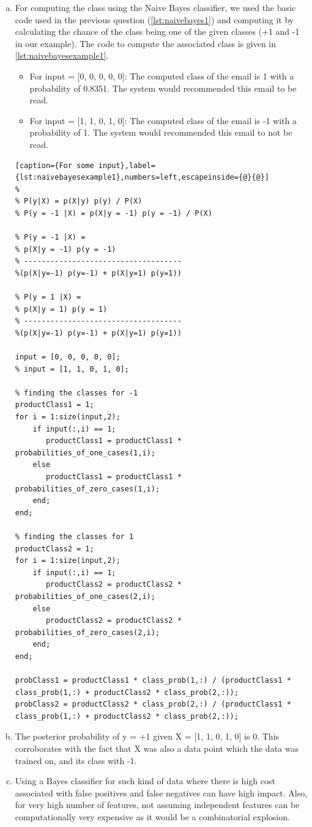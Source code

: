 \documentclass[a4paper, 11pt]{article}
\begin{document}
\begin{enumerate}[(a)]
\item For computing the class using the Naive Bayes classifier, we used the basic code used in the previous question (\autoref{lst:naivebayes1}) and computing it by calculating the chance of the class being one of the given classes (+1 and -1 in our example). The code to compute the associated class is given in \autoref{lst:naivebayesexample1}. 
\begin{itemize}
\item For input = [0, 0, 0, 0, 0]: The computed class of the email is 1 with a probability of 0.8351. The system would recommended this email to be read.
\item For input = [1, 1, 0, 1, 0]: The computed class of the email is -1 with a probability of 1. The system would recommended this email to not be read.
\end{itemize}
\vspace{-20pt}
\begin{lstlisting}[caption={For some input},label={lst:naivebayesexample1},numbers=left,escapeinside={@}{@}]
% 
% P(y|X) = p(X|y) p(y) / P(X)
% P(y = -1 |X) = p(X|y = -1) p(y = -1) / P(X)

% P(y = -1 |X) = 
% p(X|y = -1) p(y = -1)
% ------------------------------------
%(p(X|y=-1) p(y=-1) + p(X|y=1) p(y=1))

% P(y = 1 |X) = 
% p(X|y = 1) p(y = 1)
% ------------------------------------
%(p(X|y=-1) p(y=-1) + p(X|y=1) p(y=1))

input = [0, 0, 0, 0, 0];
% input = [1, 1, 0, 1, 0];

% finding the classes for -1
productClass1 = 1;
for i = 1:size(input,2); 
    if input(:,i) == 1;
       productClass1 = productClass1 *  probabilities_of_one_cases(1,i);
    else
       productClass1 = productClass1 *  probabilities_of_zero_cases(1,i);
    end;
end;

% finding the classes for 1
productClass2 = 1;
for i = 1:size(input,2);
    if input(:,i) == 1;
       productClass2 = productClass2 *  probabilities_of_one_cases(2,i);
    else
       productClass2 = productClass2 *  probabilities_of_zero_cases(2,i);
    end;
end;

probClass1 = productClass1 * class_prob(1,:) / (productClass1 * class_prob(1,:) + productClass2 * class_prob(2,:));
probClass2 = productClass2 * class_prob(2,:) / (productClass1 * class_prob(1,:) + productClass2 * class_prob(2,:));
\end{lstlisting}

\item The posterior probability of y = +1 given X = [1, 1, 0, 1, 0] is 0. This corroborates with the fact that X was also a data point which the data was trained on, and its class with -1.

\item Using a Bayes classifier for such kind of data where there is high cost associated with false positives and false negatives can have high impact. Also, for very high number of features, not assuming independent features can be computationally very expensive as it would be a combinatorial explosion.
\end{enumerate}
\end{document}

